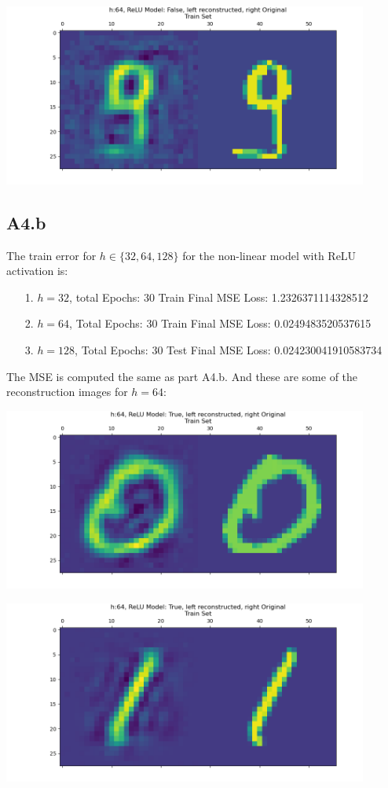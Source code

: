 \documentclass[]{article}
\begin{document}
        \begin{center}
            \includegraphics*[width=12cm]{A4plots/06-43-19-h-64-lin-digit-9.png}
        \end{center}
        
    \subsection*{A4.b}
        The train error for $h\in\{32, 64, 128\}$ for the non-linear model with ReLU activation is: 
        \begin{enumerate}
            \item[1.] $h=32$, total Epochs: 30 Train Final MSE Loss: 1.2326371114328512
            \item[2.] $h=64$, Total Epochs: 30 Train Final MSE Loss: 0.0249483520537615
            \item[3.] $h=128$, Total Epochs: 30 Test Final MSE Loss: 0.024230041910583734
        \end{enumerate}
        The MSE is computed the same as part A4.b. And these are some of the reconstruction images for $h=64$: 
        \begin{center}
            \includegraphics*[width=12cm]{A4plots/06-53-51-h-64-nonlin-digit-0.png}
        \end{center}
        \begin{center}
            \includegraphics*[width=12cm]{A4plots/06-53-51-h-64-nonlin-digit-1.png}
        \end{center}
\end{document}
